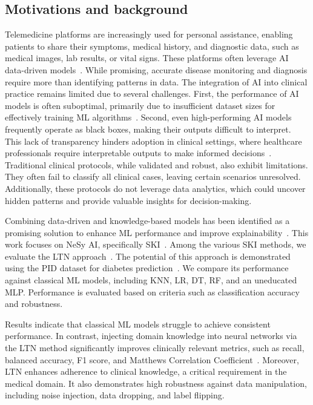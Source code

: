 \subsection{Motivations and background}
\label{subsec:motivations-and-background}
%
Telemedicine platforms are increasingly used for personal assistance, enabling patients to share their symptoms, medical history, and diagnostic data, such as medical images, lab results, or vital signs.
%
These platforms often leverage \gls{AI} data-driven models~\cite{HunterNEJMra2212850,topol2022}.
%
While promising, accurate disease monitoring and diagnosis require more than identifying patterns in data.
%
The integration of \gls{AI} into clinical practice remains limited due to several challenges.
%
First, the performance of \gls{AI} models is often suboptimal, primarily due to insufficient dataset sizes for effectively training \gls{ML} algorithms~\cite{benjamens2020state}.
%
Second, even high-performing \gls{AI} models frequently operate as black boxes, making their outputs difficult to interpret.
%
This lack of transparency hinders adoption in clinical settings, where healthcare professionals require interpretable outputs to make informed decisions~\cite{ALI2023107555}.
%
Traditional clinical protocols, while validated and robust, also exhibit limitations.
%
They often fail to classify all clinical cases, leaving certain scenarios unresolved.
%
Additionally, these protocols do not leverage data analytics, which could uncover hidden patterns and provide valuable insights for decision-making.

Combining data-driven and knowledge-based models has been identified as a promising solution to enhance \gls{ML} performance and improve explainability~\cite{von2021informed}.
%
This work focuses on \gls{NeSy} \gls{AI}, specifically \gls{SKI}~\cite{DBLP:journals/csur/CiattoSAMO24}.
%
Among the various \gls{SKI} methods, we evaluate the \gls{LTN} approach~\cite{BadreddineGSS22}.
%
The potential of this approach is demonstrated using the \gls{PID} dataset for diabetes prediction~\cite{smith1988using}.
%
We compare its performance against classical \gls{ML} models, including \gls{KNN}, \gls{LR}, \gls{DT}, \gls{RF}, and an uneducated \gls{MLP}.
%
Performance is evaluated based on criteria such as classification accuracy and robustness.

Results indicate that classical \gls{ML} models struggle to achieve consistent performance.
%
In contrast, injecting domain knowledge into neural networks via the \gls{LTN} method significantly improves clinically relevant metrics, such as recall, balanced accuracy, F1 score, and Matthews Correlation Coefficient~\cite{MATTHEWS1975442}.
%
Moreover, \gls{LTN} enhances adherence to clinical knowledge, a critical requirement in the medical domain.
%
It also demonstrates high robustness against data manipulation, including noise injection, data dropping, and label flipping.

